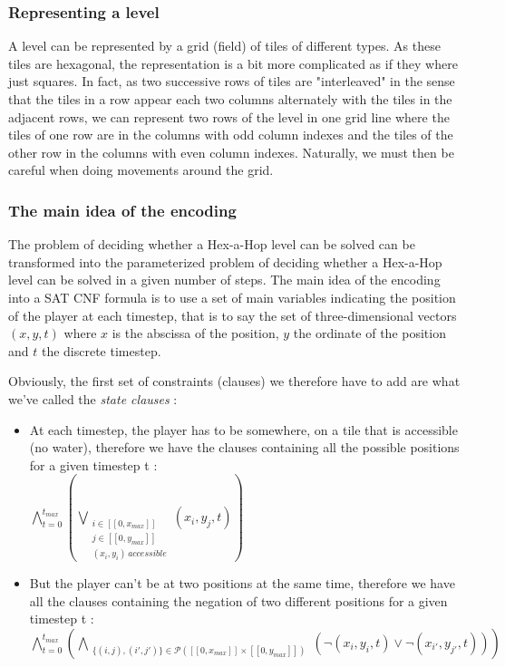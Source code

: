 \documentclass[a4paper, 12pt, titlepage]{article}
\begin{document}
\subsubsection{Representing a level}
A level can be represented by a grid (field) of tiles of different types. As
these tiles are hexagonal, the representation is a bit more complicated as if
they where just squares. In fact, as two successive rows of tiles are
"interleaved" in the sense that the tiles in a row appear each two columns
alternately with the tiles in the adjacent rows, we can represent two rows of
the level in one grid line where the tiles of one row are in the columns with
odd column indexes and the tiles of the other row in the columns with even
column indexes. Naturally, we must then be careful when doing movements around
the grid.

\subsubsection{The main idea of the encoding}
The problem of deciding whether a Hex-a-Hop level can be solved can be
transformed into the parameterized problem of deciding whether a Hex-a-Hop level
can be solved in a given number of steps.
The main idea of the encoding into a SAT CNF formula is to use a set of main
variables indicating the position of the player at each timestep, that is to say
the set of three-dimensional vectors $(x, y, t)$ where $x$ is the abscissa of
the position, $y$ the ordinate of the position and $t$ the discrete timestep.

Obviously, the first set of constraints (clauses) we therefore have to add are
what we've called the {\em state clauses} :
\begin{itemize}
\item At each timestep, the player has to be somewhere, on a tile that is
      accessible (no water), therefore we have the clauses containing all the
      possible positions for a given timestep t :\\
      $\bigwedge \limits_{t=0}^{t_{max}}
       (\bigvee \limits_{\substack{i \in [\![0, x_{max}]\!]\\
				   j \in [\![0, y_{max}]\!]\\
				   (x_i, y_i) \, accessible}}
	(x_i, y_j, t))$

\item But the player can't be at two positions at the same time, therefore we
      have all the clauses containing the negation of two different positions
      for a given timestep t :\\
      $\bigwedge \limits_{t=0}^{t_{max}}
       (\bigwedge \limits_{\substack{\{(i, j), (i', j')\} \in
				     \mathcal{P}({[\![0, x_{max}]\!] \times
						  [\![0, y_{max}]\!]})}
				     }
	(\neg(x_i, y_i, t) \vee \neg(x_{i'}, y_{j'}, t)))
       $
\end{itemize}
\end{document}

